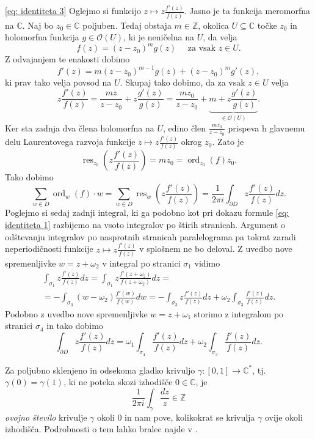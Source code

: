 \documentclass[mat1]{fmfdelo}
\numberwithin{equation}{section}
\newcommand{\Z}{\mathbb Z}
\newcommand{\C}{\mathbb C}
\newcommand{\CM}{\mathbb C ^*}
\newcommand{\res}[2]{\operatorname{res}_{#1}(#2)}
\newcommand{\ord}[2]{\operatorname{ord}_{#1}(#2)}
\newcommand{\hol}[1]{\mathcal{O}(#1)}
\theoremstyle{definition}
\begin{document}
\begin{dokaz}
    \eqref{eq: identiteta 3} Oglejmo si funkcijo $z \mapsto z \frac{f'(z)}{f(z)}$. Jasno je ta funkcija meromorfna na $\C$. Naj bo $z_0 \in \C$ poljuben. Tedaj obstaja $m \in \Z$, okolica $U \subseteq \C$ točke $z_0$ in holomorfna funkcija $g \in \hol{U}$, ki je neničelna na $U$, da velja
    \[
        f(z) = (z - z_0)^m g(z) \quad \text{ za vsak $z \in U$.}  
    \]
    Z odvajanjem te enakosti dobimo
    \[
        f'(z) = m(z - z_0)^{m - 1} g(z) + (z - z_0)^m g'(z),
    \]
    ki prav tako velja povsod na $U$. Skupaj tako dobimo, da za vsak $z \in U$ velja
    \[
        z\frac{f'(z)}{f(z)} = \frac{mz}{z-z_0} + z\frac{g'(z)}{g(z)} = \frac{mz_0}{z-z_0} + \underbrace{m + z\frac{g'(z)}{g(z)}}_{\in \hol{U}}.
    \]
    Ker sta zadnja dva člena holomorfna na $U$, edino člen $\frac{mz_0}{z-z_0}$ prispeva h glavnemu delu Laurentovega razvoja funkcije $z \mapsto z \frac{f'(z)}{f(z)}$ okrog $z_0$. Zato je 
    \[
        \operatorname{res}_{z_0} \left( z \frac{f'(z)}{f(z)} \right) = mz_0 = \ord{z_0}{f}z_0.  
    \]
    Tako dobimo 
    \[
        \sum_{w \in D} \ord{w}{f}\cdot w 
        = \sum_{w \in D} \operatorname{res}_{w} \left( z \frac{f'(z)}{f(z)} \right)
        = \frac{1}{2 \pi i} \int_{\partial D} z \frac{f'(z)}{f(z)}dz. 
    \] 
    Poglejmo si sedaj zadnji integral, ki ga podobno kot pri dokazu formule \eqref{eq: identiteta 1} razbijemo na vsoto integralov po štirih stranicah. Argument o odštevanju integralov po nasprotnih stranicah paralelograma pa tokrat zaradi neperiodičnosti funkcije $z \mapsto z \frac{f'(z)}{f(z)}$ v splošnem ne bo deloval. Z uvedbo nove spremenljivke $w = z + \omega_2$ v integral po stranici $\sigma_1$ vidimo
    \begin{multline*}
        \int_{\sigma_1} z \frac{f'(z)}{f(z)}dz = 
        \int_{\sigma_1} z \frac{f'(z + \omega_2)}{f(z + \omega_2)}dz = \\ = 
        - \int_{\sigma_3} (w - \omega_2) \frac{f'(w)}{f(w)}dw = 
        - \int_{\sigma_3} z \frac{f'(z)}{f(z)}dz + \omega_2 \int_{\sigma_3} \frac{f'(z)}{f(z)}dz.
    \end{multline*}
    Podobno z uvedbo nove spremenljivke $w = z + \omega_1$ storimo z integralom po stranici $\sigma_4$ in tako dobimo
    \[
        \int_{\partial D} z \frac{f'(z)}{f(z)}dz = \omega_1 \int_{\sigma_4} \frac{f'(z)}{f(z)}dz + \omega_2 \int_{\sigma_3} \frac{f'(z)}{f(z)}dz.
    \]

    Za poljubno sklenjeno in odsekoma gladko krivuljo $\gamma : [0,1] \to \CM$, tj. $\gamma(0) = \gamma(1)$, ki ne poteka skozi izhodišče $0\in \C$, je
    \[
        \frac{1}{2 \pi i} \int_\gamma \frac{dz}{z} \in \Z
    \]
    \emph{ovojno število} krivulje $\gamma$ okoli $0$ in nam pove, kolikokrat se krivulja $\gamma$ ovije okoli izhodišča. Podrobnosti o tem lahko bralec najde v \cite[4.2.1]{Ahlfors}.


\end{dokaz}
\end{document}
